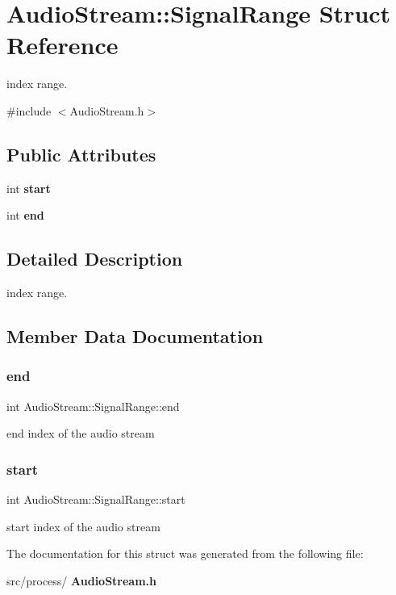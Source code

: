 \section{Audio\+Stream\+:\+:Signal\+Range Struct Reference}
\label{struct_audio_stream_1_1_signal_range}


index range.  




{\ttfamily \#include $<$Audio\+Stream.\+h$>$}

\subsection*{Public Attributes}
\begin{DoxyCompactItemize}
\item 
int \textbf{ start}
\item 
int \textbf{ end}
\end{DoxyCompactItemize}


\subsection{Detailed Description}
index range. 

\subsection{Member Data Documentation}
\mbox{\label{struct_audio_stream_1_1_signal_range_a30a9b8873379f89d7c176af6ad5689a9}} 
\subsubsection{end}
{\footnotesize\ttfamily int Audio\+Stream\+::\+Signal\+Range\+::end}

end index of the audio stream \mbox{\label{struct_audio_stream_1_1_signal_range_adcc0ad306363b02e7f6ba671eae5d511}} 
\subsubsection{start}
{\footnotesize\ttfamily int Audio\+Stream\+::\+Signal\+Range\+::start}

start index of the audio stream 

The documentation for this struct was generated from the following file\+:\begin{DoxyCompactItemize}
\item 
src/process/\textbf{ Audio\+Stream.\+h}\end{DoxyCompactItemize}
